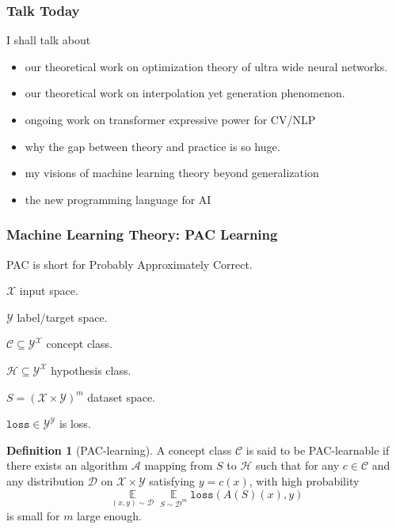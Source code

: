 \documentclass{beamer}   	%
\theoremstyle{definition}
\newtheorem*{defn}{Definition}
\newcommand{\rust}[1]{\texttt{#1}}
\newcommand{\expect}{\mathop{\mathbb{E}}}
\begin{document}
\begin{frame}
\frametitle{Talk Today}
I shall talk about
\begin{itemize}
	\item our theoretical work on optimization theory of ultra wide neural networks.
	\item our theoretical work on interpolation yet generation phenomenon.
	\item ongoing work on transformer expressive power for CV/NLP
	\item why the gap between theory and practice is so huge.
	\item my visions of machine learning theory beyond generalization
	\item the new programming language for AI
\end{itemize}
\end{frame}

\begin{frame}
\frametitle{Machine Learning Theory: PAC Learning}

PAC is short for Probably Approximately Correct.

$\mathcal{X}$ input space.

$\mathcal{Y}$ label/target space.

$\mathcal{C}\subseteq \mathcal{Y}^\mathcal{X}$ concept class.

$\mathcal{H}\subseteq \mathcal{Y}^\mathcal{X}$ hypothesis class.

$S=(\mathcal{X}\times \mathcal{Y})^m$ dataset space.

$\rust{loss}\in \mathcal{Y}^\mathcal{Y}$ is loss.

\begin{defn}[PAC-learning]
A concept class $\mathcal{C}$ is said to be PAC-learnable if there exists an algorithm $\mathcal{A}$ mapping from $S$ to $\mathcal{H}$ such that for any $c\in \mathcal{C}$ and any distribution $\mathcal{D}$ on $\mathcal{X}\times\mathcal{Y}$ satisfying $y=c(x)$, with high probability
\begin{equation}
	\expect\limits_{(x,y)\sim \mathcal{D}}\expect\limits_{S\sim \mathcal{D}^m}\rust{loss}(A(S)(x),y)
\end{equation}
is small for $m$ large enough.
\end{defn}

\end{frame}
\end{document}
